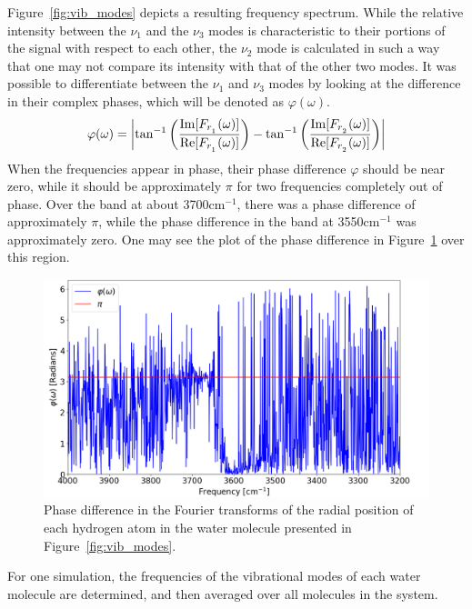 		Figure~\ref{fig:vib_modes} depicts a resulting frequency spectrum. While the relative intensity between the $\nu_1$ and the $\nu_3$ modes is characteristic to their portions of the signal with respect to each other, the $\nu_2$ mode is calculated in such a way that one may not compare its intensity with that of the other two modes. It was possible to differentiate between the $\nu_1$ and $\nu_3$ modes by looking at the difference in their complex phases, which will be denoted as $\varphi(\omega)$.
		\begin{equation}
			\varphi(\omega) = \abs{\tan^{-1}\bigg( \frac{ \Im[F_{r_{_{1}}} (\omega)]}{\Re[F_{r_{_{1}}} (\omega)]} \bigg) - \tan^{-1}\bigg( \frac{ \Im[F_{r_{_{2}}} (\omega)]}{\Re[F_{r_{_{2}}} (\omega)]} \bigg)}
		\end{equation}
		When the frequencies appear in phase, their phase difference $\varphi$ should be near zero, while it should be approximately $\pi$ for two frequencies completely out of phase. Over the band at about 3700cm$^{-1}$, there was a phase difference of approximately $\pi$, while the phase difference in the band at 3550cm$^{-1}$ was approximately zero. One may see the plot of the phase difference in Figure~\ref{fig:phase} over this region.
		
		\begin{figure}
			\centering
			\includegraphics[scale=0.5]{images/phase.png}
			\caption{Phase difference in the Fourier transforms of the radial position of each hydrogen atom in the water molecule presented in Figure~\ref{fig:vib_modes}.}
			\label{fig:phase}
		\end{figure}
		
		For one simulation, the frequencies of the vibrational modes of each water molecule are determined, and then averaged over all molecules in the system.
	
